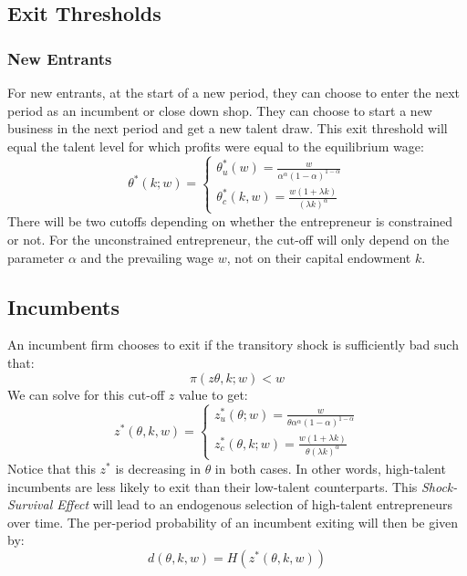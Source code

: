 \subsection{Exit Thresholds}
\subsubsection{New Entrants}
    For new entrants, at the start of a new period, they can choose to enter the next period as an incumbent or close down shop. They can choose to start a new business in the next period and get a new talent draw. This exit threshold will equal the talent level for which profits were equal to the equilibrium wage:
     \begin{equation} \label{eq:wage}
            \theta^*(k; w) = \begin{cases}
             \theta^*_u(w) =  \frac{w}{\alpha^\alpha (1-\alpha)^{1-\alpha}} \\
             \theta^*_c(k, w) = \frac{w(1+\lambda k)}{(\lambda k)^\alpha}
         \end{cases}
        \end{equation}
    There will be two cutoffs depending on whether the entrepreneur is constrained or not. For the unconstrained entrepreneur, the cut-off will only depend on the parameter $\alpha$ and the prevailing wage $w$, not on their capital endowment $k$.

    \subsection{Incumbents}

    An incumbent firm chooses to exit if the transitory shock is sufficiently bad such that:
    \begin{equation}
        \pi(z\theta, k; w) < w
    \end{equation}
    We can solve for this cut-off $z$ value to get:
   \begin{equation} \label{eq:z-star}
z^*(\theta, k, w) = \begin{cases}
    z^*_u(\theta ; w) =  \frac{w}{\theta \alpha^\alpha (1-\alpha)^{1-\alpha}} \\
    z^*_c(\theta, k; w) = \frac{w(1+\lambda k)}{\theta(\lambda k)^\alpha}    
\end{cases} 
\end{equation}
    Notice that this $z^*$ is decreasing in $\theta$ in both cases. In other words, high-talent incumbents are less likely to exit than their low-talent counterparts. This \textit{Shock-Survival Effect} will lead to an endogenous selection of high-talent entrepreneurs over time.  The per-period probability of an incumbent exiting will then be given by:
    \begin{equation}
        d(\theta, k, w) = H(z^*(\theta, k, w))
    \end{equation}    
    
